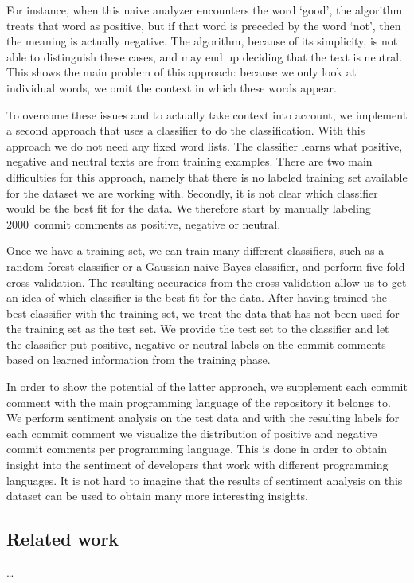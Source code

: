 \documentclass{article}
\begin{document}
For instance, when this naive analyzer encounters the word `good', the 
algorithm treats that word as positive, but if that word is preceded by the 
word `not', then the meaning is actually negative. The algorithm, because of 
its simplicity, is not able to distinguish these cases, and may end up deciding 
that the text is neutral. This shows the main problem of this approach: because 
we only look at individual words, we omit the context in which these words 
appear.

To overcome these issues and to actually take context into account, we implement
a second approach that uses a classifier to do the classification. With this
approach we do not need any fixed word lists. The classifier learns what
positive, negative and neutral texts are from training examples. There are two
main difficulties for this approach, namely that there is no labeled training
set available for the dataset we are working with. Secondly, it is not clear 
which classifier would be the best fit for the data. We therefore start by 
manually labeling 2000~commit comments as positive, negative or neutral.

Once we have a training set, we can train many different classifiers, such as 
a random forest classifier or a Gaussian naive Bayes classifier, and perform 
five-fold cross-validation. The resulting accuracies from the cross-validation 
allow us to get an idea of which classifier is the best fit for the data. After 
having trained the best classifier with the training set, we treat the data 
that has not been used for the training set as the test set. We provide the 
test set to the classifier and let the classifier put positive, negative or 
neutral labels on the commit comments based on learned information from the 
training phase.

In order to show the potential of the latter approach, we supplement each 
commit comment with the main programming language of the repository it belongs 
to. We perform sentiment analysis on the test data and with the resulting 
labels for each commit comment we visualize the distribution of positive and 
negative commit comments per programming language. This is done in order to 
obtain insight into the sentiment of developers that work with different 
programming languages. It is not hard to imagine that the results of sentiment 
analysis on this dataset can be used to obtain many more interesting insights.

\subsection{Related work}\label{sec:related-work}
\ldots
\end{document}
